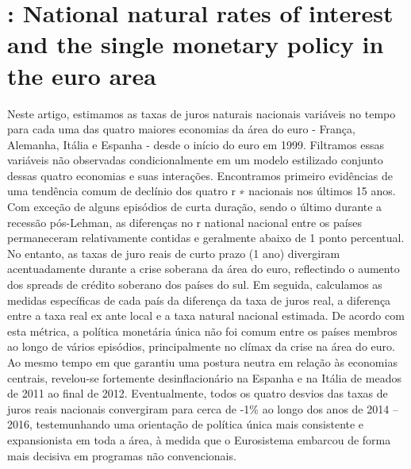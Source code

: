 \section{\citet{Fries:2018}: National natural rates of interest and the single monetary policy in the euro area}

Neste artigo, estimamos as taxas de juros naturais nacionais variáveis no tempo para cada uma das quatro maiores economias da área do euro - França, Alemanha, Itália e Espanha - desde o início do euro em 1999. Filtramos essas variáveis não observadas condicionalmente em um modelo estilizado conjunto dessas quatro economias e suas interações. Encontramos primeiro evidências de uma tendência comum de declínio dos quatro r ∗ nacionais nos últimos 15 anos. Com exceção de alguns episódios de curta duração, sendo o último durante a recessão pós-Lehman, as diferenças no r national nacional entre os países permaneceram relativamente contidas e geralmente abaixo de 1 ponto percentual. No entanto, as taxas de juro reais de curto prazo (1 ano) divergiram acentuadamente durante a crise soberana da área do euro, reflectindo o aumento dos spreads de crédito soberano dos países do sul. Em seguida, calculamos as medidas específicas de cada país da diferença da taxa de juros real, a diferença entre a taxa real ex ante local e a taxa natural nacional estimada. De acordo com esta métrica, a política monetária única não foi comum entre os países membros ao longo de vários episódios, principalmente no clímax da crise na área do euro. Ao mesmo tempo em que garantiu uma postura neutra em relação às economias centrais, revelou-se fortemente desinflacionário na Espanha e na Itália de meados de 2011 ao final de 2012. Eventualmente, todos os quatro desvios das taxas de juros reais nacionais convergiram para cerca de -1\% ao longo dos anos de 2014 –2016, testemunhando uma orientação de política única mais consistente e expansionista em toda a área, à medida que o Eurosistema embarcou de forma mais decisiva em programas não convencionais.

